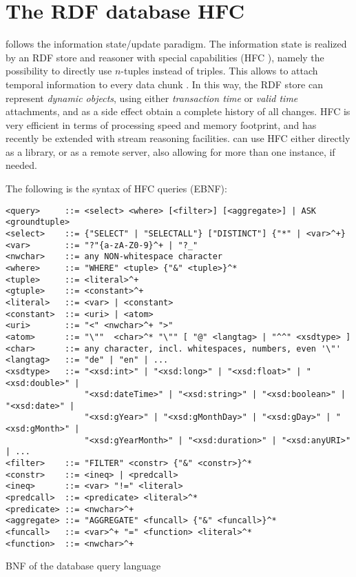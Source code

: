 \section{The RDF database HFC}

\vonda follows the information state/update paradigm. The information state is
realized by an RDF store and reasoner with special capabilities
(HFC \cite{krieger2013efficient}), namely the
possibility to directly use $n$-tuples instead of triples. This allows to
attach temporal information to every data chunk \cite{Krieger:FOIS2012,
  krieger2014detailed}. In this way, the RDF store can represent \emph{dynamic
  objects}, using either \emph{transaction time} or \emph{valid time}
attachments, and as a side effect obtain a complete history of all changes.
HFC is very efficient in terms of processing speed and memory footprint, and
has recently be extended with stream reasoning facilities. \vonda can use HFC
either directly as a library, or as a remote server, also allowing for more
than one instance, if needed.

The following is the syntax of HFC queries (EBNF):
\begin{table}[htbp]
  \centering\small
\begin{verbatim}
<query>     ::= <select> <where> [<filter>] [<aggregate>] | ASK <groundtuple>
<select>    ::= {"SELECT" | "SELECTALL"} ["DISTINCT"] {"*" | <var>^+}
<var>       ::= "?"{a-zA-Z0-9}^+ | "?_"
<nwchar>    ::= any NON-whitespace character
<where>     ::= "WHERE" <tuple> {"&" <tuple>}^*
<tuple>     ::= <literal>^+
<gtuple>    ::= <constant>^+
<literal>   ::= <var> | <constant>
<constant>  ::= <uri> | <atom>
<uri>       ::= "<" <nwchar>^+ ">"
<atom>      ::= "\""  <char>^* "\"" [ "@" <langtag> | "^^" <xsdtype> ]
<char>      ::= any character, incl. whitespaces, numbers, even '\"'
<langtag>   ::= "de" | "en" | ...
<xsdtype>   ::= "<xsd:int>" | "<xsd:long>" | "<xsd:float>" | "<xsd:double>" |
                "<xsd:dateTime>" | "<xsd:string>" | "<xsd:boolean>" | "<xsd:date>" |
                "<xsd:gYear>" | "<xsd:gMonthDay>" | "<xsd:gDay>" | "<xsd:gMonth>" |
                "<xsd:gYearMonth>" | "<xsd:duration>" | "<xsd:anyURI>" | ...
<filter>    ::= "FILTER" <constr> {"&" <constr>}^*
<constr>    ::= <ineq> | <predcall>
<ineq>      ::= <var> "!=" <literal>
<predcall>  ::= <predicate> <literal>^*
<predicate> ::= <nwchar>^+
<aggregate> ::= "AGGREGATE" <funcall> {"&" <funcall>}^*
<funcall>   ::= <var>^+ "=" <function> <literal>^*
<function>  ::= <nwchar>^+
\end{verbatim}
  \caption{BNF of the database query language}
  \label{tab:hfcquerybnf}
\end{table}

